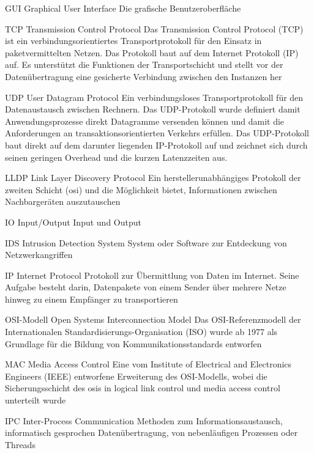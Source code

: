 
	{GUI}
	{Graphical User Interface}
	{Die grafische Benutzeroberfläche}

	{TCP}
	{Transmission Control Protocol}
	{Das Transmission Control Protocol (TCP) ist ein verbindungsorientiertes Transportprotokoll für den Einsatz in paketvermittelten Netzen. Das Protokoll baut auf dem Internet Protokoll (IP) auf. Es unterstützt die Funktionen der Transportschicht und stellt vor der Datenübertragung eine gesicherte Verbindung zwischen den Instanzen her}

	{UDP}
	{User Datagram Protocol}
	{Ein verbindungsloses Transportprotokoll für den Datenaustausch zwischen Rechnern. Das UDP-Protokoll wurde definiert damit Anwendungsprozesse direkt Datagramme versenden können und damit die Anforderungen an transaktionsorientierten Verkehrs erfüllen. Das UDP-Protokoll baut direkt auf dem darunter liegenden IP-Protokoll auf und zeichnet sich durch seinen geringen Overhead und die kurzen Latenzzeiten aus.}

	{LLDP}
	{Link Layer Discovery Protocol}
	{Ein herstellerunabhängiges Protokoll der zweiten Schicht (\gls{osi}) und die Möglichkeit bietet, Informationen zwischen Nachbargeräten auszutauschen}
	
	{IO}
	{Input/Output}
	{Input und Output}


	{IDS}
	{Intrusion Detection System}
	{System oder Software zur Entdeckung von Netzwerkangriffen}


	{IP}
	{Internet Protocol}
	{Protokoll zur Übermittlung von Daten im Internet. Seine Aufgabe besteht darin, Datenpakete von einem Sender über mehrere Netze hinweg zu einem Empfänger zu transportieren}
	
	{OSI-Modell}
	{Open Systems Interconnection Model}
	{Das OSI-Referenzmodell der Internationalen Standardisierungs-Organisation (ISO) wurde ab 1977 als Grundlage für die Bildung von Kommunikationsstandards entworfen}


	{MAC}
	{Media Access Control}
	{Eine vom Institute of Electrical and Electronics Engineers (IEEE) entworfene Erweiterung des OSI-Modells, wobei die Sicherungsschicht des \gls{osi}s in logical link control und media access control unterteilt wurde}


	{IPC}
	{Inter-Process Communication}
	{Methoden zum Informationsaustausch, informatisch gesprochen Datenübertragung, von nebenläufigen Prozessen oder Threads}


